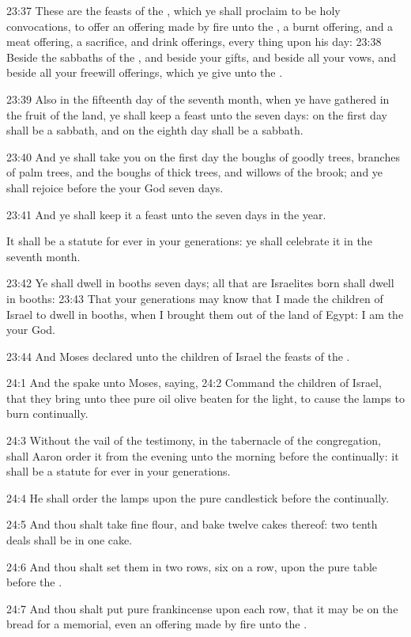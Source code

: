 23:37 These are the feasts of the \LORD, which ye shall proclaim to be
holy convocations, to offer an offering made by fire unto the \LORD, a
burnt offering, and a meat offering, a sacrifice, and drink offerings,
every thing upon his day: 23:38 Beside the sabbaths of the \LORD, and
beside your gifts, and beside all your vows, and beside all your
freewill offerings, which ye give unto the \LORD.

23:39 Also in the fifteenth day of the seventh month, when ye have
gathered in the fruit of the land, ye shall keep a feast unto the \LORD
seven days: on the first day shall be a sabbath, and on the eighth day
shall be a sabbath.

23:40 And ye shall take you on the first day the boughs of goodly
trees, branches of palm trees, and the boughs of thick trees, and
willows of the brook; and ye shall rejoice before the \LORD your God
seven days.

23:41 And ye shall keep it a feast unto the \LORD seven days in the
year.

It shall be a statute for ever in your generations: ye shall celebrate
it in the seventh month.

23:42 Ye shall dwell in booths seven days; all that are Israelites
born shall dwell in booths: 23:43 That your generations may know that
I made the children of Israel to dwell in booths, when I brought them
out of the land of Egypt: I am the \LORD your God.

23:44 And Moses declared unto the children of Israel the feasts of the
\LORD.

24:1 And the \LORD spake unto Moses, saying, 24:2 Command the children
of Israel, that they bring unto thee pure oil olive beaten for the
light, to cause the lamps to burn continually.

24:3 Without the vail of the testimony, in the tabernacle of the
congregation, shall Aaron order it from the evening unto the morning
before the \LORD continually: it shall be a statute for ever in your
generations.

24:4 He shall order the lamps upon the pure candlestick before the
\LORD continually.

24:5 And thou shalt take fine flour, and bake twelve cakes thereof:
two tenth deals shall be in one cake.

24:6 And thou shalt set them in two rows, six on a row, upon the pure
table before the \LORD.

24:7 And thou shalt put pure frankincense upon each row, that it may
be on the bread for a memorial, even an offering made by fire unto the
\LORD.

